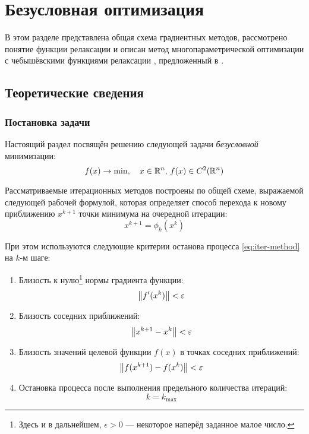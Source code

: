 \section{Безусловная оптимизация}
\label{sec:relch}

В этом разделе представлена общая схема градиентных методов,
рассмотрено понятие функции релаксации и описан метод
многопараметрической оптимизации с чебышёвскими функциями релаксации
\relch{}, предложенный  в
\cite{chernorutsky04}.

\subsection{Теоретические сведения}

\subsubsection{Постановка задачи}

Настоящий раздел посвящён решению следующей задачи \emph{безусловной}
минимизации:
\begin{equation}
  \label{eq:optim-problem-form}
  f(x) \to \min,\quad x \in \mathbb{R}^n,\, f(x) \in C^2(\mathbb{R}^n)
\end{equation}

Рассматриваемые итерационных методов построены по общей схеме,
выражаемой следующей рабочей формулой, которая определяет способ
перехода к новому приближению $x^{k+1}$ точки минимума на очередной
итерации:
\begin{equation}
  \label{eq:iter-method}
  x^{k+1} = \phi_k(x^k)
\end{equation}

При этом используются следующие критерии останова процесса
\eqref{eq:iter-method} на $k$-м шаге:
\begin{enumerate}
\item Близость к нулю\footnote{Здесь и в дальнейшем, $\epsilon>0$ —
    некоторое наперёд заданное малое число.} нормы градиента функции:
  \begin{equation*}
  \left \lVert{f'(x^k)}\right \rVert < \varepsilon
\end{equation*}

\item Близость соседних приближений:
  \begin{equation*}
    \left \lVert{x^{k+1}-x^k}\right \rVert < \varepsilon
  \end{equation*}
  
\item Близость значений целевой функции $f(x)$ в точках соседних
  приближений:
  \begin{equation*}
    \left \lVert{f(x^{k+1}) - f(x^k)}\right \rVert < \varepsilon
  \end{equation*}
\item Остановка процесса после выполнения предельного количества
  итераций:
  \begin{equation*}
    k = k_{\max}
  \end{equation*}
  
\end{enumerate}

